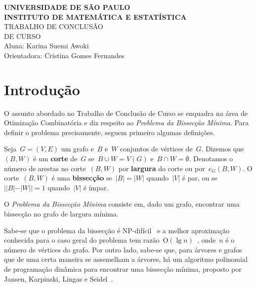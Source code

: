 \documentclass[a4paper,12pt]{article}
\newcommand{\Oh}{\mathrm{O}}
\begin{document}
 
\begin{center}
   {\large \textbf{UNIVERSIDADE DE SÃO PAULO}} \\[1.4cm]
   
   {\large \textbf{INSTITUTO DE MATEMÁTICA E ESTATÍSTICA}}\\[4.2cm]
   
   {\Huge TRABALHO DE CONCLUSÃO }\\[0.3cm]
   {\Huge DE CURSO }\\[9cm]
   
   {\large { Aluna: Karina Suemi Awoki}}\\[0.3cm]
   
   {\large { Orientadora: Cristina Gomes Fernandes}}
   

\end{center}

\newpage
\tableofcontents

\newpage


\section{Introdução}

O assunto abordado no Trabalho de Conclusão de Curso se
enquadra na área de Otimização Combinatória e diz respeito ao 
\emph{Problema da Bissecção Mínima}. Para definir o problema 
precisamente, seguem primeiro algumas definições. 

Seja~${G=(V,E)}$ um grafo e~$B$ e~$W$ conjuntos de vértices de~$G$.
Dizemos que~$(B,W)$ é um \textbf{corte}
de~$G$ se~${B \cup W =V(G)}$ e~${B\cap W =\emptyset}$.
Denotamos o número de arestas no corte~$(B,W)$ por \textbf{largura}
do corte ou por~$e_G(B,W)$.
O corte~$(B,W)$ é uma \textbf{bissecção} se~${|B| =|W|}$
quando~$|V|$ é par, ou se~${||B|-|W|| =1}$ quando~$|V|$ é ímpar.

O \emph{Problema da Bissecção Mínima} consiste em, dado um grafo, 
encontrar uma bissecção no grafo de largura mínima.

Sabe-se que o problema da bissecção é NP-difícil~\cite{GareyJS76} 
e a melhor aproximação conhecida para o caso geral do problema tem 
razão~$\Oh(\lg n)$~\cite{Racke08}, onde~$n$ é o número de vértices 
do grafo. 
Por outro lado, sabe-se que, para árvores e grafos que de uma 
certa maneira se assemelham a árvores, há um algoritmo polinomial 
de programação dinâmica para encontrar uma bissecção mínima, 
proposto por Jansen, Karpinski, Lingas e 
Seidel~\cite{JansenKLS01}. 
\end{document}
